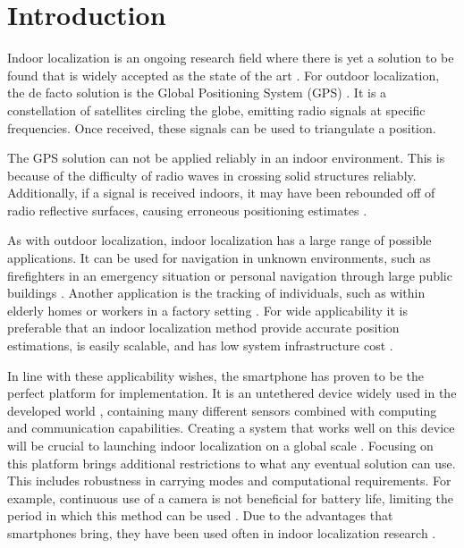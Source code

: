 
\chapter{Introduction} \label{chap:intro}

Indoor localization is an ongoing research field where there is yet a solution to be found that is widely accepted as the state of the art \cite{Davidson2017}. For outdoor localization, the de facto solution is the Global Positioning System (GPS) \cite{Jackermeier2018}. It is a constellation of satellites circling the globe, emitting radio signals at specific frequencies. Once received, these signals can be used to triangulate a position. \par 

The GPS solution can not be applied reliably in an indoor environment. This is because of the difficulty of radio waves in crossing solid structures reliably. Additionally, if a signal is received indoors, it may have been rebounded off of radio reflective surfaces, causing erroneous positioning estimates \cite{Jackermeier2018}. \par 

As with outdoor localization, indoor localization has a large range of possible applications. It can be used for navigation in unknown environments, such as firefighters in an emergency situation or personal navigation through large public buildings \cite{Correa2017, Jackermeier2018}. Another application is the tracking of individuals, such as within elderly homes or workers in a factory setting \cite{Correa2017}. For wide applicability it is preferable that an indoor localization method provide accurate position estimations, is easily scalable, and has low system infrastructure cost \cite{Correa2017}.\par

In line with these applicability wishes, the smartphone has proven to be the perfect platform for implementation.
It is an untethered device widely used in the developed world \cite{Correa2017}, containing many different sensors combined with computing and communication capabilities.
Creating a system that works well on this device will be crucial to launching indoor localization on a global scale \cite{Gu2019}. Focusing on this platform brings additional restrictions to what any eventual solution can use. This includes robustness in carrying modes and computational requirements.  For example, continuous use of a camera is not beneficial for battery life, limiting the period in which this method can be used \cite{Yang2014, Solin2018a}. Due to the advantages that smartphones bring, they have been used often in indoor localization research \cite{Jackermeier2018,Correa2017,Yang2014, Qian2013}. \par 

